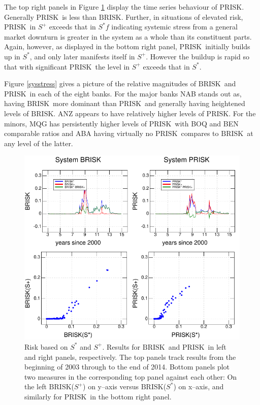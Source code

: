 \documentclass[12pt]{article}
\newcommand{\br}{\ensuremath{\mathrm{BRISK}}}
\newcommand{\pr}{\ensuremath{\mathrm{PRISK}}}
\newcommand{\fref}[1]{Figure \ref{#1}}
\begin{document}
The top right panels in \fref{muqs} display the time series behaviour of \pr.  Generally \pr\ is less than \br.   Further, in situations of elevated risk,  \pr\ in $S^+$ exceeds that in $S^*f$ indicating systemic stress from a general market downturn is greater in the system as a whole than its constituent parts.   Again, however, as displayed in the bottom right panel, \pr\ initially builds up in $S^*$, and only later manifests itself in $S^+$.  However the buildup is rapid so that with significant \pr\ the level in $S^+$ exceeds that in $S^*$.

\fref{sysstress} gives a picture of the relative magnitudes of \br\ and \pr\ in each of the eight banks.   For the major banks NAB stands out as, having \br\ more dominant than \pr\ and generally having heightened levels of \br.   ANZ appears to have relatively higher levels of \pr.    For the minors, MQG has persistently higher levels of \pr\ with BOQ and BEN comparable ratios and ABA having virtually no \pr\ compares to \br\ at any level of the latter.  

\begin{figure}[htbp]
\begin{center}
\includegraphics[width=16cm]{figures/muqs.pdf}
\caption{Risk based on $S^*$ and $S^+$.  Results for \br\ and \pr\ in left and right panels, respectively.   The top panels track results   from the beginning of 2003 through to the end of 2014.   Bottom panels  plot  two measures in the corresponding top panel against each other: On the left \br($S^+$) on y--axis versus \br($S^*$) on x--axis, and similarly for  \pr\ in the bottom right panel.}\label{muqs}
\end{center}
\end{figure}
\end{document}
